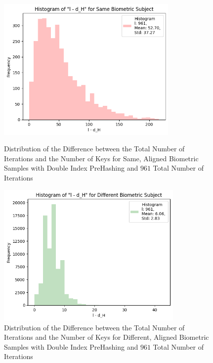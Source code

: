 \begin{enumerate}
\begin{itemize}
            \begin{figure}[H]
                \centering
                \begin{minipage}[b]{0.48\linewidth}
                    \centering
                    \includegraphics[width=\linewidth,height=7cm,keepaspectratio]{latex-img/l-dHconfig2_same.png}
                    \caption{Distribution of the Difference between the Total Number of Iterations and the Number of Keys for Same, Aligned Biometric Samples with Double Index PreHashing and $961$ Total Number of Iterations}
                    \label{l-dHconfig2_same}
                \end{minipage}
                \hfill
                \begin{minipage}[b]{0.48\linewidth}
                    \centering
                    \includegraphics[width=\linewidth,height=7cm,keepaspectratio]{latex-img/l-dHconfig2_diff.png}
                    \caption{Distribution of the Difference between the Total Number of Iterations and the Number of Keys for Different, Aligned Biometric Samples with Double Index PreHashing and $961$ Total Number of Iterations}
                    \label{l-dHconfig2_diff}
                \end{minipage}
            \end{figure}


\end{itemize}
\end{enumerate}
